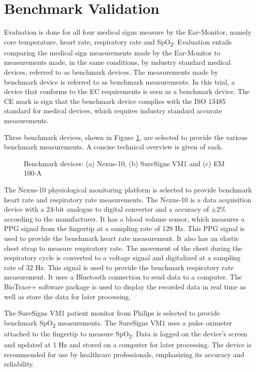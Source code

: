 \section{Benchmark Validation}
Evaluation is done for all four medical signs measure by the Ear-Monitor, namely core temperature, heart rate, respiratory rate and SpO\textsubscript{2}. Evaluation entails comparing the medical sign measurements made by the Ear-Monitor to measurements made, in the same conditions, by industry standard medical devices, referred to as benchmark devices. The measurements made by benchmark device is referred to as benchmark measurements. In this trial, a device that conforms to the EC requirements is seen as a benchmark device. The CE mark is sign that the benchmark device complies with the ISO 13485 standard for medical devices, which requires industry standard accurate measurements.

\medskip

Three benchmark devices, shown in Figure \ref{fig:Benchmark}, are selected to provide the various benchmark measurements. A concise technical overview is given of each.

\begin{figure}[H]
\centering
\graphicspath{{figs/}}

\caption{Benchmark devices: (a) Nexus-10, (b) SureSigns VM1 and (c) EM 100-A}
\label{fig:Benchmark}
\end{figure}

The Nexus-10 physiological monitoring platform is selected to provide benchmark heart rate and respiratory rate measurements. The Nexus-10 is a data acquisition device with a 24-bit analogue to digital converter and a accuracy of $\pm$2\% according to the manufacturer. It has a blood volume sensor, which measures a PPG signal from the fingertip at a sampling rate of 128 Hz. This PPG signal is used to provide the benchmark heart rate measurement. It also has an elastic chest strap to measure respiratory rate. The movement of the chest during the respiratory cycle is converted to a voltage signal and digitalized at a sampling rate of 32 Hz. This signal is used to provide the benchmark respiratory rate measurement. It uses a Bluetooth connection to send data to a computer. The BioTrace+ software package is used to display the recorded data in real time as well as store the data for later processing.

\medskip

The SureSigns VM1 patient monitor from Philips is selected to provide benchmark SpO\textsubscript{2} measurements. The SureSigns VM1 uses a pulse oximeter attached to the fingertip to measure SpO\textsubscript{2}. Data is logged on the device's screen and updated at 1 Hz and stored on a computer for later processing. The device is recommended for use by healthcare professionals, emphasizing its accuracy and reliability.

